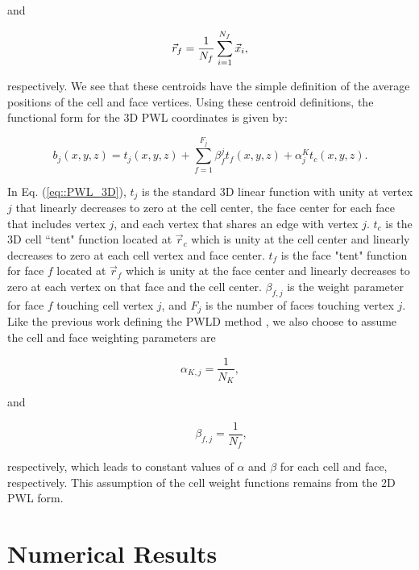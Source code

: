\noindent and

\begin{equation}
\label{eq::PWL_3D_face_center}
	\vec{r}_{f} = \frac{1}{N_f} \sum\displaylimits_{i=1}^{N_f} \vec{x}_i ,
\end{equation}

\noindent respectively. We see that these centroids have the simple definition of the average positions of the cell and face vertices. Using these centroid definitions, the functional form for the 3D PWL coordinates is given by:

\begin{equation}
\label{eq::PWL_3D}
	b_j (x,y,z)  = t_j  (x,y,z) + \sum_{f=1}^{F_j} \beta_f^j  t_f (x,y,z) + \alpha_j^K t_c  (x,y,z) .
\end{equation}

\noindent In Eq. (\ref{eq::PWL_3D}), $t_j$ is the standard 3D linear function with unity at vertex $j$ that linearly decreases to zero at the cell center, the face center for each face that includes vertex $j$, and each vertex that shares an edge with vertex $j$. $t_c$ is the 3D cell ``tent" function located at $\vec{r}_c$ which is unity at the cell center and linearly decreases to zero at each cell vertex and face center. $t_f$ is the face "tent" function for face $f$ located at $\vec{r}_{f}$ which is unity at the face center and linearly decreases to zero at each vertex on that face and the cell center. $\beta_{f,j}$ is the weight parameter for face $f$ touching cell vertex $j$, and $F_j$ is the number of faces touching vertex $j$. Like the previous work defining the PWLD method \cite{bailey2008phd}, we also choose to assume the cell and face weighting parameters are

\begin{equation}
\alpha_{K,j} = \frac{1}{N_K},
\label{eq::PWL_center_weight_val}
\end{equation}

\noindent and

\begin{equation}
\qquad \beta_{f,j} = \frac{1}{N_f},
\label{eq::PWL_face_weight_val}
\end{equation}

\noindent respectively, which leads to constant values of $\alpha$ and $\beta$ for each cell and face, respectively. This assumption of the cell weight functions remains from the 2D PWL form. 

\section{Numerical Results}
\label{sec::BF_Results}

